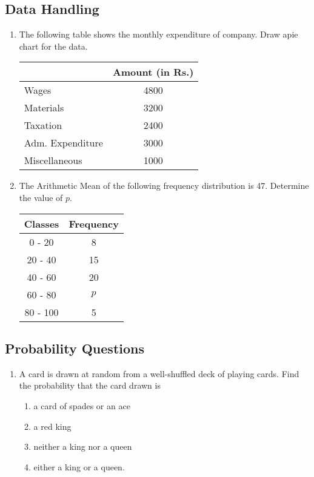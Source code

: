 \documentclass{article}
\begin{document}
\subsection{Data Handling}
\begin{enumerate}
\item The following table shows the monthly expenditure of company. Draw apie chart for the data.

\begin{tabular}{|l|c|}
\hline
\ & Amount (in Rs.) \\
\hline
Wages & 4800 \\
Materials & 3200 \\
Taxation & 2400 \\
Adm. Expenditure & 3000 \\
Miscellaneous & 1000 \\
\hline
\end{tabular}


\item The Arithmetic Mean of the following frequency distribution is 47. Determine the value of $p$.
\begin{tabular}{|c|c|}
\hline
Classes & Frequency \\
\hline
0 - 20 & 8 \\
20 - 40 & 15 \\
40 - 60 & 20 \\
60 - 80 & $p$ \\
80 - 100 & 5 \\
\hline
\end{tabular}



\end{enumerate}

\subsection{Probability Questions}
\begin{enumerate}

\item A card is drawn at random from a well-shuffled deck of playing cards. Find the probability that the card drawn is

 \begin{enumerate}
        \item a card of spades or an ace
        \item a red king
        \item neither a king nor a queen
        \item either a king or a queen.
 \end{enumerate}

\end{enumerate}
\end{document}
